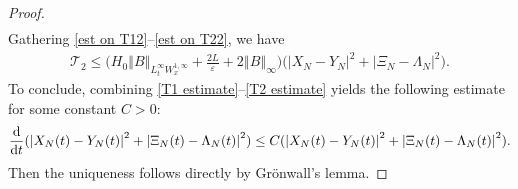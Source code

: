 \documentclass[11pt,reqno]{amsart}
\numberwithin{equation}{section}
\def\dd{{\rm d}}
\begin{document}
\begin{proof}
\begin{align}
\end{align}
Gathering \eqref{est on T12}--\eqref{est on T22}, we have
\begin{align}
\mathcal{T}_{2}
\leq \big(H_{0}\left\Vert B\right\Vert_{L^{\infty}_{t}W^{1,\infty}_{x}}+\frac{2L}{\varepsilon}+2\left\Vert B\right\Vert_{\infty}\big)\big(\left\vert X_{N}-Y_{N}\right\vert^{2}+\left\vert \Xi_{N}-\Lambda_{N}\right\vert^{2}\big). \label{T2 estimate}  
\end{align}
To conclude, combining \eqref{T1 estimate}--\eqref{T2 estimate}  yields the following estimate 
for some constant $C>0$: 
\begin{align*}
\frac{\dd}{\dd t}(\left\vert X_{N}(t)-Y_{N}(t)\right\vert^{2}+\left\vert \Xi_{N}(t)-\Lambda_{N}(t)\right\vert^{2})\leq C(\left\vert X_{N}(t)-Y_{N}(t)\right\vert^{2} +\left\vert \Xi_{N}(t)-\Lambda_{N}(t)\right\vert^{2} ).     
\end{align*}
Then the uniqueness follows directly by Gr\"onwall's lemma. 
\end{proof}


\appendix
\end{document}
